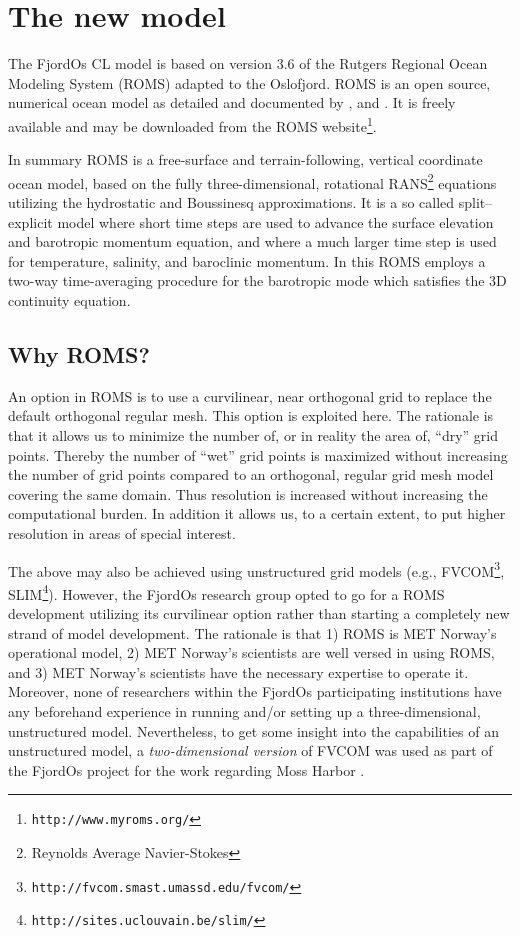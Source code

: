 \section{The new model}
\label{sec:model}
The FjordOs CL model is based on version 3.6 of the Rutgers Regional Ocean Modeling System (ROMS) adapted to the Oslofjord. ROMS is an open source, numerical ocean model as detailed and documented by \cite{haidv:etal:2008}, \cite{shche:mcwil:2003} and \cite{shche:mcwil:2005, shche:mcwil:2009}. It is freely available and may be downloaded from the ROMS website\footnote{\texttt{http://www.myroms.org/}}. 

In summary ROMS is a free-surface and terrain-following, vertical coordinate ocean model, based on the fully three-dimensional, rotational RANS\footnote{Reynolds Average Navier-Stokes} equations utilizing the hydrostatic and Boussinesq approximations. It is a so called split–explicit model where short time steps are used to advance the surface elevation and barotropic momentum equation, and where a much larger time step is used for temperature, salinity, and baroclinic momentum. In this ROMS employs a two-way time-averaging procedure for the barotropic mode which satisfies the 3D continuity equation. 

\subsection{Why ROMS?}
An option in ROMS is to use a curvilinear, near orthogonal grid to replace the default orthogonal regular mesh. This option is exploited here. The rationale is that it allows us to minimize the number of, or in reality the area of, ``dry'' grid points. Thereby the number of ``wet'' grid points is maximized without increasing the number of grid points compared to an orthogonal, regular grid mesh model covering the same domain. Thus resolution is increased without increasing the computational burden. In addition it allows us, to a certain extent, to put higher resolution in areas of special interest.

The above may also be achieved using unstructured grid models (e.g., FVCOM\footnote{\texttt{http://fvcom.smast.umassd.edu/fvcom/}}, SLIM\footnote{\texttt{http://sites.uclouvain.be/slim/}}). However, the FjordOs research group opted to go for a ROMS development utilizing its curvilinear option rather than starting a completely new strand of model development. The rationale is that 1) ROMS is MET Norway's operational model, 2) MET Norway's scientists are well versed in using ROMS, and 3) MET Norway's scientists have the necessary expertise to operate it. Moreover, none of researchers within the FjordOs participating institutions have any beforehand experience in running and/or setting up a three-dimensional, unstructured model. Nevertheless, to get some insight into the capabilities of an unstructured model, a \emph{two-dimensional version} of FVCOM was used as part of the FjordOs project for the work regarding Moss Harbor \citep{hjelm:etal:2014}.  
   

